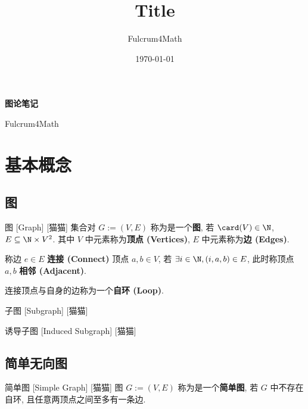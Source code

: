 \documentclass[UTF8]{ctexart}
\title{Title}
\author{Fulcrum4Math}
\date{\today}
\begin{document}
    \begin{center}
        {\LARGE\textbf{图论笔记}}

        Fulcrum4Math
    \end{center}

    \tableofcontents

    \newpage

    \section{基本概念} %

        \subsection{图} %
            
            \begin{dfn}
                []
                {图}
                [Graph]
                [猫猫]
                集合对 \(G:=(V,E)\) 称为是一个\textbf{图}, 若 \(\card(V)\in\N\), \(E\subseteq \N\times V^2\). 其中 \(V\) 中元素称为\textbf{顶点 (Vertices)}, \(E\) 中元素称为\textbf{边 (Edges)}. 

                称边 \(e\in E\) \textbf{连接 (Connect)} 顶点 \(a,b\in V\), 若 \(\exists i\in\N, (i,a,b)\in E\), 此时称顶点 \(a,b\) \textbf{相邻 (Adjacent)}. 

                连接顶点与自身的边称为一个\textbf{自环 (Loop)}.
            \end{dfn}
            
            \begin{dfn}
                []
                {子图}
                [Subgraph]
                [猫猫]
            \end{dfn}
            
            \begin{dfn}
                []
                {诱导子图}
                [Induced Subgraph]
                [猫猫]
            \end{dfn}

        \subsection{简单无向图}

            \begin{dfn}
                []
                {简单图}
                [Simple Graph]
                [猫猫]
                图 \(G:=(V,E)\) 称为是一个\textbf{简单图}, 若 \(G\) 中不存在自环, 且任意两顶点之间至多有一条边. 
            \end{dfn}
            
\end{document}
